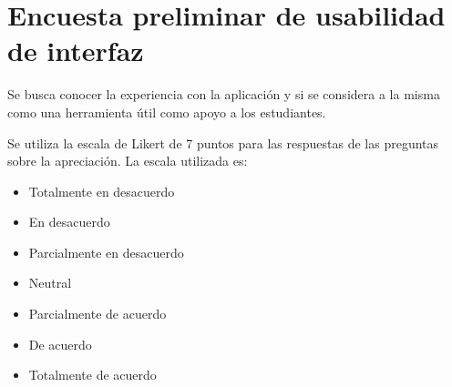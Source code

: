 \section{Encuesta preliminar de usabilidad de interfaz}

Se busca conocer la experiencia con la aplicación y si se considera a la misma
como una herramienta útil como apoyo a los estudiantes.

Se utiliza la escala de Likert de 7 puntos para las respuestas de las preguntas
sobre la apreciación. La escala utilizada es:

\begin{itemize}
    \item Totalmente en desacuerdo
    \item En desacuerdo
    \item Parcialmente en desacuerdo
    \item Neutral
    \item Parcialmente de acuerdo
    \item De acuerdo
    \item Totalmente de acuerdo
\end{itemize}

